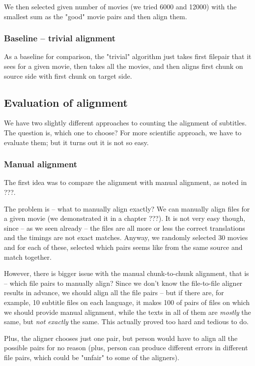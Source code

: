 We then selected given number of movies (we tried 6000 and 12000) with the smallest sum as the "good" movie pairs and then align them.

\subsubsection{Baseline -- trivial alignment}
As a baseline for comparison, the "trivial" algorithm just takes first filepair that it sees for a given movie, then takes all the movies, and then aligns first chunk on source side with first chunk on target side.

\subsection{Evaluation of alignment}
We have two slightly different approaches to counting the alignment of subtitles. The question is, which one to choose? For more scientific approach, we have to evaluate them; but it turns out it is not so easy.

\subsubsection{Manual alignment}
The first idea was to compare the alignment with manual alignment, as noted in ???.

The problem is -- what to manually align exactly? We can manually align files for a given movie (we demonstrated it in a chapter ???). It is not very easy though, since -- as we seen already -- the files are all more or less the correct translations and the timings are not exact matches. Anyway, we randomly selected 30 movies and for each of these, selected which pairs seems like from the same source and match together.

However, there is bigger issue with the manual chunk-to-chunk alignment, that is -- which file pairs to manually align? Since we don't know the file-to-file aligner results in advance, we should align all the file pairs -- but if there are, for example, 10 subtitle files on each language, it makes 100 of pairs of files on which we should provide manual alignment, while the texts in all of them are \emph{mostly} the same, but \emph{not exactly} the same. This actually proved too hard and tedious to do.

Plus, the aligner chooses just one pair, but person would have to align all the possible pairs for no reason (plus, person can produce different errors in different file pairs, which could be "unfair" to some of the aligners).

